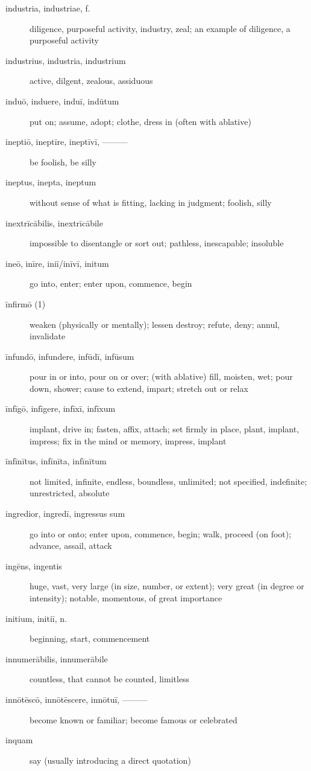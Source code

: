 \begin{description}
    \item[industria, industriae, f.] diligence, purposeful activity, industry, zeal; an example of diligence, a purposeful activity
    \item[industrius, industria, industrium] active, dilgent, zealous, assiduous
    \item[induō, induere, induī, indūtum] put on; assume, adopt; clothe, dress in (often with ablative)
    \item[ineptiō, ineptīre, ineptīvī, ———] be foolish, be silly
    \item[ineptus, inepta, ineptum] without sense of what is fitting, lacking in judgment; foolish, silly
    \item[inextrīcābilis, inextrīcābile] impossible to disentangle or sort out; pathless, inescapable; insoluble
    \item[ineō, inīre, iniī/inīvī, initum] go into, enter; enter upon, commence, begin
    \item[īnfirmō (1)] weaken (physically or mentally); lessen destroy; refute, deny; annul, invalidate
    \item[īnfundō, infundere, infūdī, infūsum] pour in or into, pour on or over; (with ablative) fill, moisten, wet; pour down, shower; cause to extend, impart; stretch out or relax
    \item[īnfīgō, infīgere, infīxī, infīxum] implant, drive in; fasten, affix, attach; set firmly in place, plant, implant, impress; fix in the mind or memory, impress, implant
    \item[īnfīnītus, infīnīta, infīnītum] not limited, infinite, endless, boundless, unlimited; not specified, indefinite; unrestricted, absolute
    \item[ingredior, ingredī, ingressus sum] \marginnote{*}go into or onto; enter upon, commence, begin; walk, proceed (on foot); advance, assail, attack
    \item[ingēns, ingentis] huge, vast, very large (in size, number, or extent); very great (in degree or intensity); notable, momentous, of great importance
    \item[initium, initiī, n.] \marginnote{*}beginning, start, commencement
    \item[innumerābilis, innumerābile] countless, that cannot be counted, limitless
    \item[innōtēscō, innōtēscere, innōtuī, ———] become known or familiar; become famous or celebrated
    \item[inquam] \marginnote{*}say (usually introducing a direct quotation)

\end{description}
